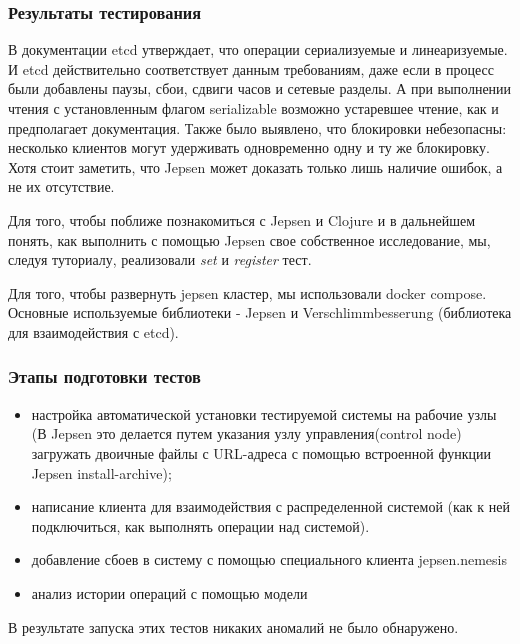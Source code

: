 \documentclass[12pt,  openany]{book}
\begin{document}
\subsubsection{Результаты тестирования}
\par
В документации etcd утверждает, что операции сериализуемые и линеаризуемые. 
И etcd действительно соответствует данным требованиям, даже если в процесс были добавлены паузы, сбои, сдвиги часов и сетевые разделы. А при выполнении чтения с установленным флагом serializable возможно устаревшее чтение, как и предполагает документация.
Также было выявлено, что блокировки небезопасны: несколько клиентов могут удерживать одновременно одну и ту же блокировку.
Хотя стоит заметить, что Jepsen может доказать только лишь наличие ошибок, а не их отсутствие.
\par
Для того, чтобы поближе познакомиться с Jepsen и Clojure и в дальнейшем понять, как выполнить с помощью Jepsen свое собственное исследование, мы, следуя туториалу, реализовали \textit{set} и \textit{register} тест.  
\par Для того, чтобы развернуть jepsen  кластер, мы использовали docker compose. 
Основные используемые библиотеки - Jepsen и Verschlimmbesserung (библиотека для взаимодействия с etcd). 
\subsubsection{Этапы подготовки тестов}
\begin{itemize}
\item настройка автоматической установки тестируемой системы на рабочие узлы (В Jepsen это делается путем указания узлу управления(control node) загружать двоичные файлы с URL-адреса с помощью встроенной функции Jepsen install-archive);
\item написание клиента для взаимодействия с распределенной системой (как к ней подключиться, как выполнять операции над системой). 
\item добавление сбоев в систему с помощью специального клиента jepsen.nemesis
\item анализ истории операций с помощью модели
\end{itemize}
В результате запуска этих тестов никаких аномалий не было обнаружено.

\end{document}
